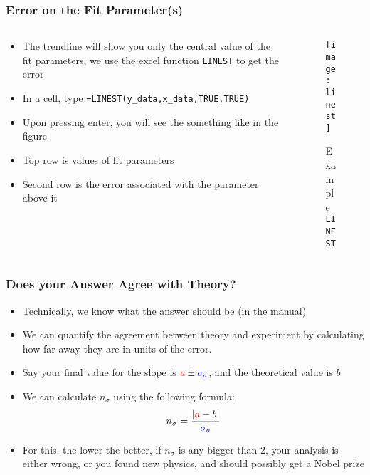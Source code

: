 \documentclass[aspectratio=169]{beamer}
\begin{document}
\begin{frame}
  \frametitle{Error on the Fit Parameter(s)}
  \begin{columns}
    \begin{column}{0.6\textwidth}
      \begin{itemize}
      \item The trendline will show you only the central value of the fit parameters, we use the excel function \texttt{LINEST} to get the error
      \item In a cell, type \texttt{=LINEST(y\_data,x\_data,TRUE,TRUE)}
      \item Upon pressing enter, you will see the something like in the figure
      \item Top row is values of fit parameters
      \item Second row is the error associated with the parameter above it
      \end{itemize}
    \end{column}
    \begin{column}{0.4\textwidth}
      \begin{figure}[H]
        \centering
        \texttt{[image: linest]}
        \caption{Example \texttt{LINEST}}
      \end{figure}
    \end{column}
  \end{columns}
\end{frame}

\begin{frame}
  \frametitle{Does your Answer Agree with Theory?}
  \begin{itemize}
  \item Technically, we know what the answer should be (in the manual)
  \item We can quantify the agreement between theory and experiment by calculating how far away they are in units of the error.
  \item Say your final value for the slope is ${\color{red}a}\pm{\color{blue}\sigma_a}$, and the theoretical value is $b$
  \item We can calculate $n_\sigma$ using the following formula:
    \begin{align*}
      n_\sigma=\frac{\abs{{\color{red}a}-b}}{\color{blue}\sigma_a}
    \end{align*}
  \item For this, the lower the better, if $n_\sigma$ is any bigger than 2, your analysis is either wrong, or you found new physics, and should possibly get a Nobel prize
  \end{itemize}
\end{frame}
\end{document}
